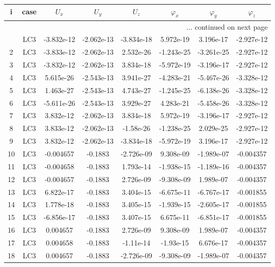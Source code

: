 \documentclass{article}%
\begin{document}
\begin{longtable}{| c c | c c c c c c |}%
\hline%
i&case&$U_x$&$U_y$&$U_z$&$\varphi_x$&$\varphi_y$&$\varphi_z$\\%
\hline%
\endhead%
\hline%
\multicolumn{8}{r}{... continued on next page}\\%
\endfoot%
\hline%
\endlastfoot%
1&LC3&{-}3.832e{-}12&{-}2.062e{-}13&{-}3.834e{-}18&5.972e{-}19&3.196e{-}17&{-}2.927e{-}12\\%
2&LC3&{-}3.833e{-}12&{-}2.062e{-}13&2.532e{-}26&{-}1.243e{-}25&{-}3.261e{-}25&{-}2.927e{-}12\\%
3&LC3&{-}3.832e{-}12&{-}2.062e{-}13&3.834e{-}18&{-}5.972e{-}19&{-}3.196e{-}17&{-}2.927e{-}12\\%
4&LC3&5.615e{-}26&{-}2.543e{-}13&3.941e{-}27&{-}4.283e{-}21&{-}5.467e{-}26&{-}3.328e{-}12\\%
5&LC3&1.463e{-}27&{-}2.543e{-}13&4.743e{-}27&{-}1.245e{-}25&{-}6.138e{-}26&{-}3.328e{-}12\\%
6&LC3&{-}5.611e{-}26&{-}2.543e{-}13&3.929e{-}27&4.283e{-}21&{-}5.458e{-}26&{-}3.328e{-}12\\%
7&LC3&3.832e{-}12&{-}2.062e{-}13&3.834e{-}18&5.972e{-}19&{-}3.196e{-}17&{-}2.927e{-}12\\%
8&LC3&3.833e{-}12&{-}2.062e{-}13&{-}1.58e{-}26&{-}1.238e{-}25&2.029e{-}25&{-}2.927e{-}12\\%
9&LC3&3.832e{-}12&{-}2.062e{-}13&{-}3.834e{-}18&{-}5.972e{-}19&3.196e{-}17&{-}2.927e{-}12\\%
10&LC3&{-}0.004657&{-}0.1883&{-}2.726e{-}09&9.308e{-}09&{-}1.989e{-}07&{-}0.004357\\%
11&LC3&{-}0.004658&{-}0.1883&1.793e{-}14&{-}1.938e{-}15&{-}1.189e{-}16&{-}0.004357\\%
12&LC3&{-}0.004657&{-}0.1883&2.726e{-}09&{-}9.308e{-}09&1.989e{-}07&{-}0.004357\\%
13&LC3&6.822e{-}17&{-}0.1883&3.404e{-}15&{-}6.675e{-}11&{-}6.767e{-}17&{-}0.001855\\%
14&LC3&1.778e{-}18&{-}0.1883&3.405e{-}15&{-}1.939e{-}15&{-}2.605e{-}17&{-}0.001855\\%
15&LC3&{-}6.856e{-}17&{-}0.1883&3.407e{-}15&6.675e{-}11&{-}6.851e{-}17&{-}0.001855\\%
16&LC3&0.004657&{-}0.1883&2.726e{-}09&9.308e{-}09&1.989e{-}07&{-}0.004357\\%
17&LC3&0.004658&{-}0.1883&{-}1.11e{-}14&{-}1.93e{-}15&6.676e{-}17&{-}0.004357\\%
18&LC3&0.004657&{-}0.1883&{-}2.726e{-}09&{-}9.308e{-}09&{-}1.989e{-}07&{-}0.004357\\%

\end{longtable}
\end{document}
